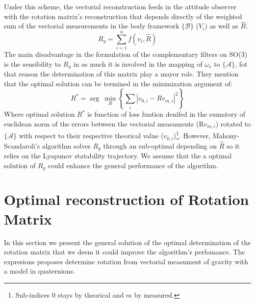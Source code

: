 \documentclass[conference]{IEEEtran}
\newcommand{\marco}[1]{\{\mathcal{#1}\}}
\begin{document}
Under this scheme, the vectorial reconstruction feeds in the attitude observer with the rotation matrix's reconstruction that depends directly of the weighted sum of the vectorial measurements in the body framework $\marco{B}$ ($V_i$) as well as $\hat{R}$: 
\begin{equation}\label{ReconstruccionVectorial}
R_y=\sum_{i=1}^{n}f(v_i,\hat{R})
\end{equation}
The main disadvantage in the formulation of the complementary filters on SO(3) is the sensibility  to $R_y$ in as much it is involved in the mapping of $\omega_s$ to $\marco{A}$, fot that reason the determination of this matrix play a mayor role. They mention that the optimal solution can be termined in the minimization argument of:
\begin{equation}\label{ProblemaOptimizacion}
R^*=\arg~\min_{R}\left\{\sum_i|v_{0,i}-Rv_{m,i}|^2\right\}
\end{equation}
Where optimal solution  $R^*$ is function of loss funtion denifed in the sumatory of euclidean norm of the errors between the vectorial measuments   (R$v_{m,i}$) rotated to $\marco{A}$ with respect to their respective theorical value ($v_{0,i}$)\footnote{Sub-indices $0$ stays by theorical and $m$ by measured.}. However, Mahony-Scandaroli's algorithm solves $R_y$ through an sub-optimal depending on $\hat{R}$ so it relies on the Lyapunov statability trajectory.  We assume that the a optimal solution of $R_y$ could enhance the general performance of the algorithm.
\section{Optimal reconstruction of Rotation Matrix \label{opt_reconstruction}}
In this section we present the general solution of the optimal determination of the rotation matrix that we deem it could improve the algorithm's perfomance. The expresions proposes determine rotation from vectorial measument of gravity with a model in quaternions. 
\end{document}
